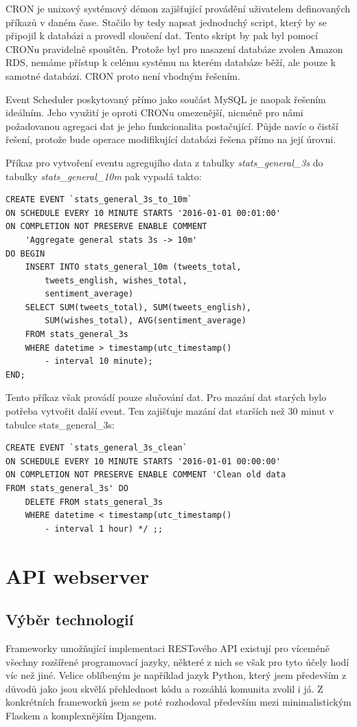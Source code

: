 \documentclass[thesis=B,czech]{FITthesis}[2012/06/26]
\begin{document}
	CRON je unixový systémový démon zajišťující provádění uživatelem definovaných příkazů v daném čase. Stačilo by tedy napsat jednoduchý script, který by se připojil k databázi a provedl sloučení dat. Tento skript by pak byl pomocí CRONu pravidelně spouštěn. Protože byl pro nasazení databáze zvolen Amazon RDS, nemáme přístup k celému systému na kterém databáze běží, ale pouze k samotné databázi. CRON proto není vhodným řešením. 
	
	Event Scheduler poskytovaný přímo jako součást MySQL je naopak řešením ideálním. Jeho využití je oproti CRONu omezenější, nicméně pro námi požadovanou agregaci dat je jeho funkcionalita postačující. Půjde navíc o čistší řešení, protože bude operace modifikující databázi řešena přímo na její úrovni. 
	
	Příkaz pro vytvoření eventu agregujího data z tabulky \textit{stats\_general\_3s} do tabulky \textit{stats\_general\_10m }pak vypadá takto:
	
\begin{lstlisting}
CREATE EVENT `stats_general_3s_to_10m` 
ON SCHEDULE EVERY 10 MINUTE STARTS '2016-01-01 00:01:00' 
ON COMPLETION NOT PRESERVE ENABLE COMMENT 
	'Aggregate general stats 3s -> 10m' 
DO BEGIN 
	INSERT INTO stats_general_10m (tweets_total, 
		tweets_english, wishes_total, 
		sentiment_average) 
	SELECT SUM(tweets_total), SUM(tweets_english), 
		SUM(wishes_total), AVG(sentiment_average) 
	FROM stats_general_3s 
	WHERE datetime > timestamp(utc_timestamp() 
		- interval 10 minute); 
END;
\end{lstlisting}

Tento příkaz však provádí pouze slučování dat. Pro mazání dat starých bylo potřeba vytvořit další event. Ten zajišťuje mazání dat starších než 30 minut v tabulce stats\_general\_3s:

\begin{lstlisting}
CREATE EVENT `stats_general_3s_clean` 
ON SCHEDULE EVERY 10 MINUTE STARTS '2016-01-01 00:00:00' 
ON COMPLETION NOT PRESERVE ENABLE COMMENT 'Clean old data 
FROM stats_general_3s' DO 
	DELETE FROM stats_general_3s
	WHERE datetime < timestamp(utc_timestamp() 
		- interval 1 hour) */ ;;
\end{lstlisting}

\section{API webserver}
\subsection{Výběr technologií}
	Frameworky umožňující implementaci RESTového API existují pro víceméně všechny rozšířené programovací jazyky, některé z nich se však pro tyto účely hodí víc než jiné. Velice oblíbeným je například jazyk Python, který jsem především z důvodů jako jsou skvělá přehlednost kódu a rozsáhlá komunita zvolil i já. Z konkrétních frameworků jsem se poté rozhodoval především mezi minimalistickým Flaskem a komplexnějším Djangem. 
	
\end{document}

